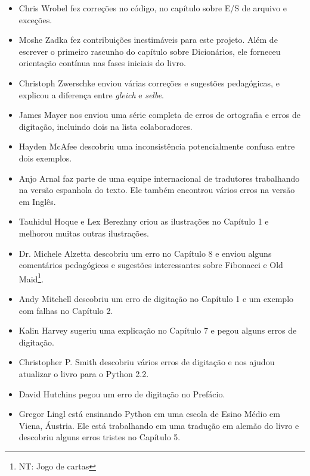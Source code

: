 \documentclass[10pt]{book}
\begin{document}
\begin {itemize}
\item Chris Wrobel fez correções no código, no capítulo sobre
E/S de arquivo e exceções. 

\item Moshe Zadka fez contribuições inestimáveis ​​para este projeto.
Além de escrever o primeiro rascunho do capítulo sobre Dicionários, ele
forneceu orientação contínua nas fases iniciais do livro.

\item Christoph Zwerschke enviou várias correções e
sugestões pedagógicas, e explicou a diferença entre {\em gleich}
e {\em selbe}.

\item James Mayer nos enviou uma série completa de erros de ortografia e
erros de digitação, incluindo dois na lista colaboradores.

\item Hayden McAfee descobriu uma inconsistência potencialmente confusa
entre dois exemplos.

\item Anjo Arnal faz parte de uma equipe internacional de tradutores
trabalhando na versão espanhola do texto. Ele também encontrou vários
erros na versão em Inglês.

\item Tauhidul Hoque e Lex Berezhny criou as ilustrações
no Capítulo 1 e melhorou muitas outras ilustrações.

\item Dr. Michele Alzetta descobriu um erro no Capítulo 8 e enviou
alguns comentários pedagógicos e sugestões interessantes sobre Fibonacci
e Old Maid\footnote{NT: Jogo de cartas}.

\item Andy Mitchell descobriu um erro de digitação no Capítulo 1 e um exemplo com falhas
no Capítulo 2.

\item Kalin Harvey sugeriu uma explicação no Capítulo 7 e
pegou alguns erros de digitação.

\item Christopher P. Smith descobriu vários erros de digitação e nos ajudou
atualizar o livro para o Python 2.2.

\item David Hutchins pegou um erro de digitação no Prefácio.

\item Gregor Lingl está ensinando Python em uma escola de Esino Médio em Viena,
Áustria. Ele está trabalhando em uma tradução em alemão do livro
e descobriu alguns erros tristes no Capítulo 5.


\end{itemize}
\end{document}
